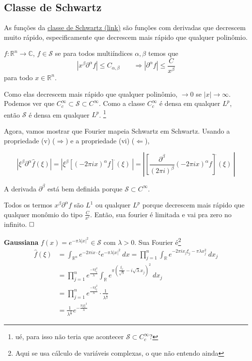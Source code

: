 \documentclass[11pt]{article}
\newcommand{\qed}{$\hfill\square$}
\newcommand{\R}{\mathbb{R}}
\newcommand{\C}{\mathbb{C}}
\newcommand{\Rn}{{\mathbb{R}^n}}
\newcommand{\p}{\partial}
\newcommand{\parentesis}[1]{\left(#1\right)}
\begin{document}
\subsection{Classe de Schwartz}

As funções da \href{https://en.wikipedia.org/wiki/Schwartz_space}{classe de Schwartz (link)} são funções com derivadas que decrescem muito rápido, especificamente que decrescem mais rápido que qualquer polinômio. 

\(f:\Rn \rightarrow \C\), \(f \in \mathcal{S}\) se para todos multiíndices \(\alpha, \beta\) temos que  \[ \left| x^\beta \partial^\alpha f \right| \leq C_{\alpha, \beta} \qquad \Rightarrow |\partial^\alpha f| \leq \frac{C}{x^\beta}\] para todo \(x \in \Rn\).

Como elas decrescem mais rápido que qualquer polinômio, \(\rightarrow 0\) se \(|x| \rightarrow \infty\). Podemos ver que \(C^\infty_c \subset \mathcal{S} \subset C^\infty \). Como a classe \(C^\infty_c\) é densa em qualquer \(L^p\), então \(\mathcal{S}\) é densa em qualquer \(L^p\). \footnote{ué, para isso não teria que acontecer \(\mathcal{S} \subset C^\infty_c\)?}

Agora, vamos mostrar que Fourier mapeia Schwartz em Schwartz. Usando a propriedade (v) (\(\Rightarrow\)) e a propriedade (vi) (\(\Leftarrow\)),

\[ \left| \xi^\beta \partial^\alpha \hat{f}(\xi) \right| = \left| \xi^\beta \left[ (-2\pi i x)^\alpha f\right]^{\hat{}}(\xi)\ \right| = \left|  \left[   \frac{\partial^\beta}{(2\pi i)^\beta}    (-2\pi i x)^\alpha f\right]^{\hat{}}(\xi)\ \right|  \]

A derivada \(\partial^\beta\) está bem definida porque \(\mathcal{S} \subset C^\infty\).

Todos os termos \(x^\beta \p^\alpha f\) são \(L^1\) ou qualquer \(L^p\) porque decrescem mais rápido que qualquer monômio do tipo \(\frac{C}{x^{c}}\).  Então, sua fourier é limitada e vai pra zero no infinito. \qed 

\textbf{Gaussiana}
\(f(x) = e^{-\pi \lambda |x|^2} \in \mathcal{S}\) com \(\lambda>0\). Sua Fourier é\footnote{Aqui se usa cálculo de variáveis complexas, o que não entendo ainda} \begin{align*}
	\hat{f}(\xi)&= \int_\Rn e^{-2\pi i x \cdot \xi } e^{-\pi \lambda |x|^2}\ dx 
	= \prod_{j=1}^{n}\int_\R e^{-2\pi i x_j \xi_j  - \pi \lambda x_j^2}\ dx_j\\ &= \prod_{j=1}^n e^{ \frac{-\pi \xi_j^2}{\lambda}} \int_\R e^{\pi \parentesis{\frac{\xi_j}{\sqrt{\lambda}} - i \sqrt{\lambda} x_j }^2}\ dx_j \\
	&= \prod_{j=1}^n e^{ \frac{-\pi \xi_j^2}{\lambda}} \cdot \frac{1}{\lambda^{\frac{1}{2}}}\\
	&= \frac{1}{\lambda^{\frac{n}{2}}}e^{-\frac{\pi |\xi|^2}{\lambda}}
\end{align*}
\end{document}
